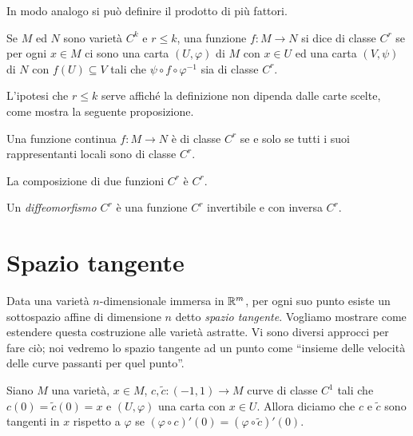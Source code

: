In modo analogo si può definire il prodotto di più fattori.
 
 \begin{definition} 
  Se $M$ ed $N$ sono varietà $C^k$ e $r\le k$, una funzione $f:M\to N$ si dice
  di classe $C^r$ se per ogni $x\in M$ ci sono una carta $(U,\varphi)$ di $M$ con
  $x\in U$ ed una carta $(V,\psi)$ di $N$ con $f(U)\subseteq V$ tali che $\psi\circ f\circ\varphi^{-1}$
  sia di classe $C^r$.
 \end{definition}
 
 L'ipotesi che $r\le k$ serve affiché la definizione non dipenda dalle carte scelte, come
 mostra la seguente proposizione.
 
 \begin{proposition}
  Una funzione continua $f:M\to N$ è di classe $C^r$ se e solo se tutti i suoi rappresentanti locali sono di classe $C^r$.
 \end{proposition}
 
 \begin{proposition}
   La composizione di due funzioni $C^r$ è $C^r$.
 \end{proposition}
 
 \begin{definition} 
  Un \emph{diffeomorfismo $C^r$} è una funzione $C^r$ invertibile e con inversa $C^r$.
 \end{definition}
 
 \section{Spazio tangente}
 
 Data una varietà $n$-dimensionale immersa in $\mathbb R^m$, per ogni suo punto esiste
 un sottospazio affine di dimensione $n$ detto \emph{spazio tangente}. Vogliamo
 mostrare come estendere questa costruzione alle varietà astratte. Vi sono diversi
 approcci per fare ciò; noi vedremo lo spazio tangente ad un punto come ``insieme delle
 velocità delle curve passanti per quel punto''.
 
\begin{definition}
	Siano $M$ una varietà, $x\in M$, $c,\tilde{c}:(-1,1)\to M$ curve di classe $C^1$ tali che $c(0)=\tilde{c}(0)=x$ e $(U,\varphi)$ una carta con $x\in U$. Allora diciamo che $c$ e $\tilde{c}$ sono 	tangenti in $x$ rispetto a $\varphi$ se $(\varphi\circ c)'(0)=(\varphi\circ\tilde{c})'(0)$.
\end{definition}

